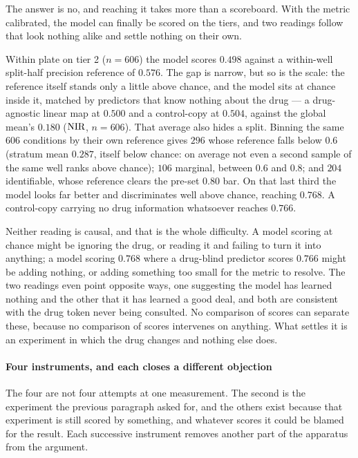 \noindent
The answer is no, and reaching it takes more than a scoreboard. With the metric
calibrated, the model can finally be scored on the tiers, and two readings follow
that look nothing alike and settle nothing on their own.

Within plate on tier 2 ($n = \num{606}$) the model scores $0.498$ against a
within-well split-half precision reference of $0.576$. The gap is narrow, but so is the scale: the
reference itself stands only a little above chance, and the model sits at chance
inside it, matched by predictors that know nothing about the drug --- a drug-agnostic linear map at $0.500$ and a control-copy at $0.504$, against the global mean's $0.180$ ($\textrm{NIR}$, $n = 606$). That average also hides a split. Binning the same $\num{606}$
conditions by their own reference gives $296$ whose reference falls below $0.6$ (stratum mean $0.287$, itself below chance: on average not even a second sample of the same well ranks above chance); $106$ marginal, between $0.6$ and $0.8$; and $204$ identifiable, whose reference clears the pre-set $0.80$ bar. On that last third the model looks far better and
discriminates well above chance, reaching $0.768$. A control-copy carrying no
drug information whatsoever reaches $0.766$.

Neither reading is causal, and that is the whole difficulty. A model scoring at
chance might be ignoring the drug, or reading it and failing to turn it into
anything; a model scoring $0.768$ where a drug-blind predictor scores $0.766$
might be adding nothing, or adding something too small for the metric to resolve.
The two readings even point opposite ways, one suggesting the model has learned
nothing and the other that it has learned a good deal, and both are consistent
with the drug token never being consulted. No comparison of scores can separate
these, because no comparison of scores intervenes on anything. What settles it is
an experiment in which the drug changes and nothing else does.

\paragraph{Four instruments, and each closes a different objection} The four are
not four attempts at one measurement. The second is the experiment the previous
paragraph asked for, and the others exist because that experiment is still scored
by something, and whatever scores it could be blamed for the result. Each
successive instrument removes another part of the apparatus from the argument.

